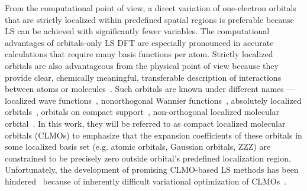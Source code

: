 \documentclass[aps,prl,twocolumn,reprint,amsmath,amssymb]{revtex4-1}
\begin{document}
From the computational point of view, a direct variation of one-electron orbitals that are strictly localized within predefined spatial regions is preferable because LS can be achieved with significantly fewer variables. %
The computational advantages of orbitals-only LS DFT are especially pronounced in accurate calculations that require many basis functions per atom. 
Strictly localized orbitals are also advantageous from the physical point of view because they provide clear, chemically meaningful, transferable description of interactions between atoms or molecules~\cite{ZZZweitao,stoll,khaliullin2007unravelling,khaliullin2008analysis}. 
%
Such orbitals are known under different names --- localized wave functions~\cite{ordejon1995linear}, nonorthogonal Wannier functions~\cite{weitao,ZZZ}, absolutely localized orbitals~\cite{stoll1980use}, orbitals on compact support~\cite{ZZZ}, non-orthogonal localized molecular orbital~\cite{weitao}. In this work, they will be referred to as compact localized molecular orbitals (CLMOs) to emphasize that the expansion coefficients of these orbitals in some localized basis set (e.g. atomic orbitals, Gaussian orbitals, ZZZ) are constrained to be precisely zero outside orbital's predefined localization region.
Unfortunately, the development of promising CLMO-based LS methods has been hindered~\cite{a:weitao-yang-2013,a:ls-tsuchida-aomm, fattebert-recent} because of inherently difficult variational optimization of CLMOs~\cite{a:ls-mauri-galli-car-1993,ordejon1995linear,a:ls-rev-1999, fattebert2004linear, peng2013effective, a:ls-tsuchida-aomm, weitao-yang}. 
%
\end{document}
